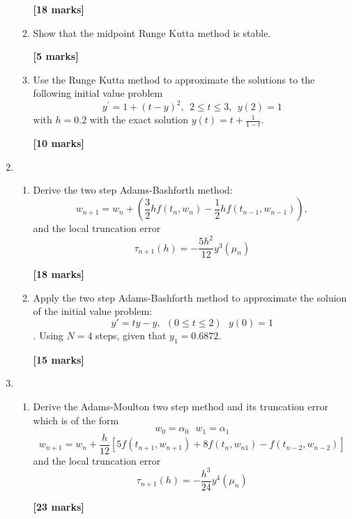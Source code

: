 \begin{enumerate}
\begin{enumerate}
\begin{flushright}
\textbf{[18 marks]}
\end{flushright}


\item 
Show that the midpoint Runge Kutta method is stable.
\begin{flushright}
\textbf{[5 marks]}
\end{flushright}

\item
Use the Runge Kutta method to approximate the solutions to the following initial
value problem
\[y^{'}=1+(t-y)^2, \ \ 2\leq t \leq 3, \ \ y(2)=1\]
with $h=0.2$ with the exact solution $y(t)=t +\frac{1}{1-t}$.
\begin{flushright}
\textbf{[10 marks]}
\end{flushright}

\end{enumerate}
\item
\begin{enumerate}
\item
Derive the two step Adams-Bashforth method:
\[ w_{n+1}=w_n+(\frac{3}{2}hf(t_{n},w_{n})-\frac{1}{2}hf(t_{n-1},w_{n-1})),\]
and the local truncation error
\[ \tau_{n+1}(h)=-\frac{5h^2}{12}y^{3}(\mu_n)\]
\begin{flushright}
\textbf{[18 marks]}
\end{flushright}

\item
Apply the two step Adams-Bashforth method to approximate the soluion of the initial value problem:
\[ y'=ty-y, \ \ (0\leq t \leq 2) \ \ \ y(0)=1\].
Using $N=4$ steps, given that $y_1=0.6872$.
\begin{flushright}
\textbf{[15 marks]}
\end{flushright}

\end{enumerate}

\item
\begin{enumerate}
\item
Derive the Adams-Moulton two step method and its truncation error which is of the form
\[w_0=\alpha_0 \ \ \ w_1=\alpha_1 \]
\[w_{n+1}=w_n + \frac{h}{12}[5f(t_{n+1},w_{n+1})+8f(t_{n},w_{n1})-f(t_{n-2},w_{n-2})] \]
and the local truncation error
\[ \tau_{n+1}(h)=-\frac{h^3}{24}y^{4}(\mu_n)\]

\begin{flushright}
\textbf{[23 marks]}
\end{flushright}


\end{enumerate}
\end{enumerate}
